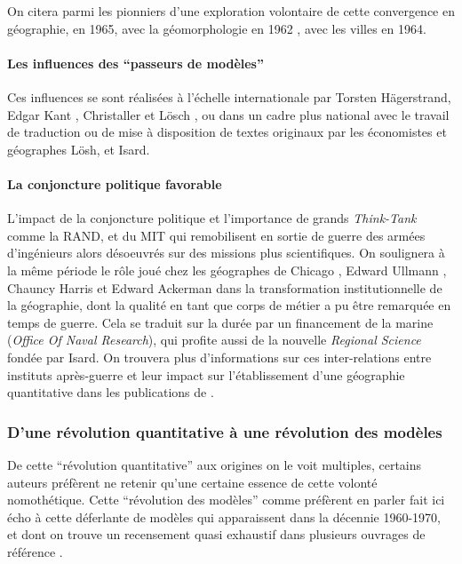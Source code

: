 On citera parmi les pionniers d'une exploration volontaire de cette convergence en géographie, \textcite{Haggett1965} en 1965, \textcite{Chorley1962} avec la géomorphologie en 1962 , \textcite{Berry1964a} avec les villes en 1964.

\paragraph{Les influences des \enquote{passeurs de modèles}}

Ces influences se sont réalisées à l'échelle internationale par Torsten Hägerstrand, Edgar Kant , Christaller et Lösch \autocite[119]{Berry1970}, ou dans un cadre plus national avec le travail de traduction ou de mise à disposition de textes originaux par les économistes et géographes Lösh, et Isard.

\paragraph{La conjoncture politique favorable}
L'impact de la conjoncture politique et l'importance de grands \textit{Think-Tank} comme la RAND, et du MIT qui remobilisent en sortie de guerre des armées d'ingénieurs alors désoeuvrés sur des missions plus scientifiques. On soulignera à la même période le rôle joué chez les géographes de Chicago \autocite{Harris1979}, Edward Ullmann \autocites{Ullman1941, Harris1977, Glick1988}, Chauncy Harris \autocite{Harris1945, Lichtenberger2005} et Edward Ackerman \autocites{Ackerman1958, Ackerman1963} dans la transformation institutionnelle de la géographie, dont la qualité en tant que corps de métier a pu être remarquée en temps de guerre. Cela se traduit sur la durée par un financement de la marine (\textit{Office Of Naval Research}), qui profite aussi de la nouvelle \textit{Regional Science} fondée par Isard. On trouvera plus d'informations sur ces inter-relations entre instituts après-guerre et leur impact sur l'établissement d'une géographie quantitative dans les publications de \textcites{Barnes2006a, Barnes2008}.

\subsubsection{D'une révolution quantitative à une révolution des modèles}
\label{ssec:revol_modele}

De cette \enquote{révolution quantitative} aux origines on le voit multiples, certains auteurs préfèrent ne retenir qu'une certaine essence de cette volonté nomothétique. Cette \enquote{révolution des modèles} comme préfèrent en parler \textcite{Wilson1970, Varenne2014} fait ici écho à cette déferlante de modèles qui apparaissent dans la décennie 1960-1970, et dont on trouve un recensement quasi exhaustif dans plusieurs ouvrages de référence \autocite{Haggett1965,Chorley1967}.

